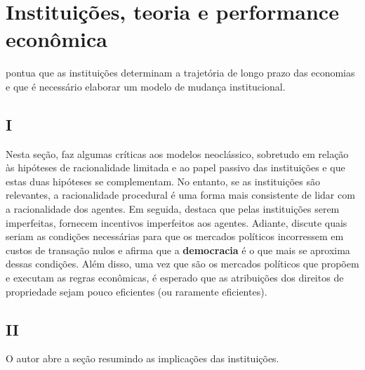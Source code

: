 \section*{Instituições, teoria e performance econômica}

\autor pontua que as instituições determinam a trajetória de longo prazo das economias e que é necessário elaborar um modelo de mudança institucional.

\subsection*{I}

Nesta seção, faz algumas críticas aos modelos neoclássico, sobretudo em relação às hipóteses de racionalidade limitada e ao papel passivo das instituições e que estas duas hipóteses se complementam. No entanto, se as instituições são relevantes, a racionalidade procedural é uma forma mais consistente de lidar com a racionalidade dos agentes. Em seguida, destaca que pelas instituições serem imperfeitas, fornecem incentivos imperfeitos aos agentes. Adiante, discute quais seriam as condições necessárias para que os mercados políticos incorressem em custos de transação nulos e afirma que a \textbf{democracia} é o que mais se aproxima dessas condições. Além disso, uma vez que são os mercados políticos que propõem e executam as regras econômicas, é esperado que as atribuições dos direitos de propriedade sejam pouco eficientes (ou raramente eficientes).

\subsection*{II}

O autor abre a seção resumindo as implicações das instituições.


